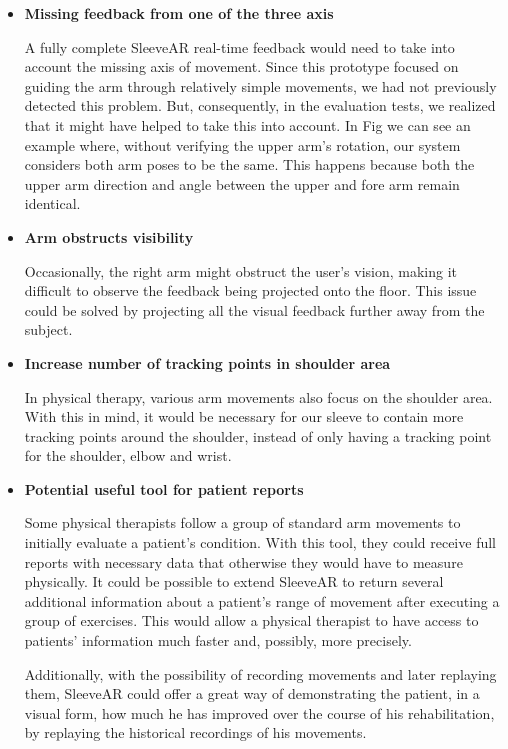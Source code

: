 \begin{itemize}
\item \textbf{Missing feedback from one of the three axis}

A fully complete SleeveAR real-time feedback would need to take into account the missing axis of movement. Since this prototype focused on guiding the arm through relatively simple movements, we had not previously detected this problem. But, consequently, in the evaluation tests, we realized that it might have helped to take this into account. In Fig  we can see an example where, without verifying the upper arm's rotation, our system considers both arm poses to be the same. This happens because both the upper arm direction and angle between the upper and fore arm remain identical.


\item \textbf{Arm obstructs visibility}

Occasionally, the right arm might obstruct the user's vision, making it difficult to observe the feedback being projected onto the floor. This issue could be solved by projecting all the visual feedback further away from the subject.

\item \textbf{Increase number of tracking points in shoulder area}

In physical therapy, various arm movements also focus on the shoulder area. With this in mind, it would be necessary for our sleeve to contain more tracking points around the shoulder, instead of only having a tracking point for the shoulder, elbow and wrist.

\item \textbf{Potential useful tool for patient reports}

Some physical therapists follow a group of standard arm movements to initially evaluate a patient's condition. With this tool, they could receive full reports with necessary data that otherwise they would have to measure physically. It could be possible to extend SleeveAR to return several additional information about a patient's range of movement after executing a group of exercises. This would allow a physical therapist to have access to patients' information much faster and, possibly, more precisely. 

Additionally, with the possibility of recording movements and later replaying them, SleeveAR could offer a great way of demonstrating the patient, in a visual form, how much he has improved over the course of his rehabilitation, by replaying the historical recordings of his movements.


\end{itemize}
